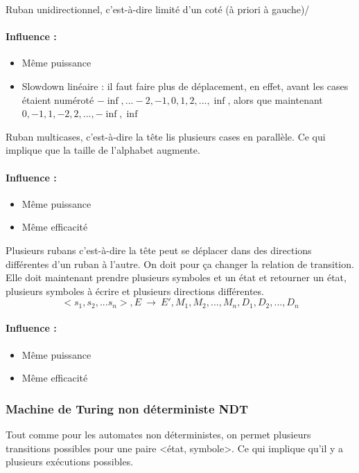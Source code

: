 \documentclass[11pt,a4paper]{article}
\theoremstyle{definition}
\begin{document}
Ruban unidirectionnel, c'est-à-dire limité d'un coté (à priori à gauche)/

\paragraph{Influence :} 
\begin{itemize}
	\item Même puissance
	\item Slowdown linéaire : il faut faire plus de déplacement, en 
		effet, avant les cases étaient numéroté 
		$-\inf,...-2,-1,0,1,2,...,\inf$, alors que maintenant
	       	$0,-1,1,-2,2,...,-\inf,\inf$ 
\end{itemize}

Ruban multicases, c'est-à-dire la tête lis plusieurs cases en parallèle. Ce qui 
implique que la taille de l'alphabet augmente.

\paragraph{Influence :} 
\begin{itemize}
	\item Même puissance
	\item Même efficacité
\end{itemize}

Plusieurs rubans c'est-à-dire la tête peut se déplacer dans des directions 
différentes d'un ruban à l'autre. On doit pour ça changer la relation de 
transition. Elle doit maintenant prendre plusieurs symboles et un état et 
retourner un état, plusieurs symboles à écrire et plusieurs directions différentes.
$$<s_1,s_2,...s_n>, E \  \rightarrow \ E', M_1, M_2,..., M_n, D_1, D_2,..., 
D_n$$
\paragraph{Influence :} 
\begin{itemize}
	\item Même puissance
	\item Même efficacité
\end{itemize}

\subsubsection{Machine de Turing non déterministe NDT}
Tout comme pour les automates non déterministes, on permet plusieurs 
transitions possibles pour une paire <état, symbole>. Ce qui implique qu'il y a 
plusieurs exécutions possibles.
\end{document}
